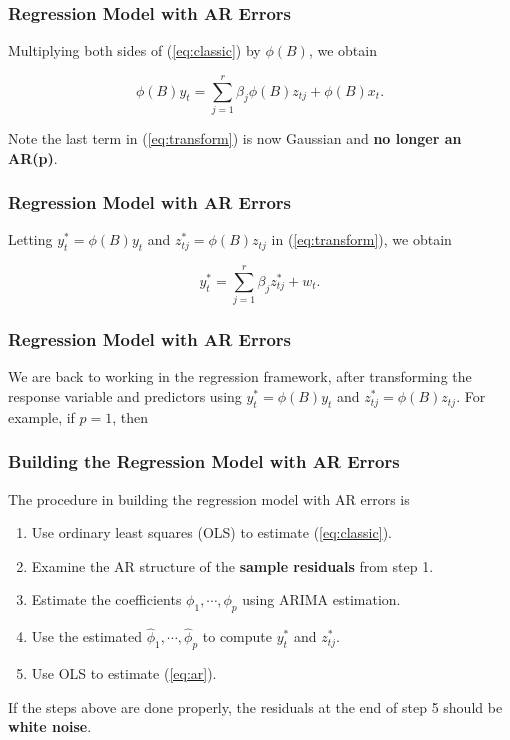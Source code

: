 \documentclass[%
xcolor=pdftex]{beamer}
\begin{document}
\begin{frame}
\frametitle{Regression Model with AR Errors}

Multiplying both sides of (\ref{eq:classic}) by $\phi(B)$, we obtain

\begin{equation} \label{eq:transform}
\phi(B) y_t = \sum_{j=1}^r \beta_j \phi(B) z_{tj} + \phi(B)x_t.
\end{equation}

Note the last term in (\ref{eq:transform}) is now Gaussian and \textbf{no longer an AR(p)}. 

\end{frame}

\begin{frame}
\frametitle{Regression Model with AR Errors}

Letting $y_t^* = \phi(B) y_t$ and $z_{tj}^* = \phi(B) z_{tj}$ in (\ref{eq:transform}), we obtain

\begin{equation} \label{eq:ar}
y_t^* = \sum_{j=1}^r \beta_j z_{tj}^* + w_t.
\end{equation}



\end{frame}

\begin{frame}
\frametitle{Regression Model with AR Errors}

We are back to working in the regression framework, after transforming the response variable and predictors using $y_t^* = \phi(B) y_t$ and $z_{tj}^* = \phi(B) z_{tj}$. For example, if $p=1$, then

\vspace{40mm}

\end{frame}




\begin{frame}
\frametitle{Building the Regression Model with AR Errors}

The procedure in building the regression model with AR errors is

\begin{enumerate}
\item Use ordinary least squares (OLS) to estimate (\ref{eq:classic}).
\item Examine the AR structure of the \textbf{sample residuals} from step 1.
\item Estimate the coefficients $\phi_1, \cdots, \phi_p$ using ARIMA estimation.
\item Use the estimated $\hat{\phi}_1, \cdots, \hat{\phi}_p$ to compute $y_t^*$ and $z_{tj}^*$.
\item Use OLS to estimate (\ref{eq:ar}).
\end{enumerate}

If the steps above are done properly, the residuals at the end of step 5 should be \textbf{white noise}.


\end{frame}
\end{document}
